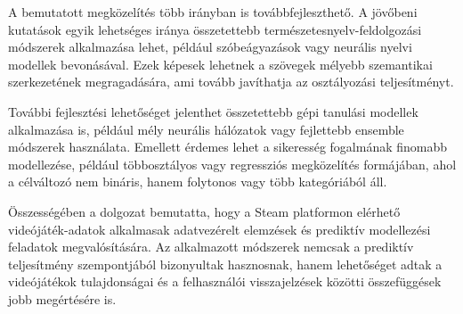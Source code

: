 A bemutatott megközelítés több irányban is továbbfejleszthető.
A jövőbeni kutatások egyik lehetséges iránya
összetettebb természetesnyelv-feldolgozási módszerek alkalmazása lehet,
például szóbeágyazások vagy neurális nyelvi modellek bevonásával.
Ezek képesek lehetnek a szövegek mélyebb szemantikai szerkezetének
megragadására, ami tovább javíthatja az osztályozási teljesítményt.

További fejlesztési lehetőséget jelenthet
összetettebb gépi tanulási modellek alkalmazása is,
például mély neurális hálózatok vagy fejlettebb ensemble módszerek használata.
Emellett érdemes lehet a sikeresség fogalmának finomabb modellezése,
például többosztályos vagy regressziós megközelítés formájában,
ahol a célváltozó nem bináris,
hanem folytonos vagy több kategóriából áll.

Összességében a dolgozat bemutatta,
hogy a Steam platformon elérhető videójáték-adatok
alkalmasak adatvezérelt elemzések és prediktív modellezési feladatok
megvalósítására.
Az alkalmazott módszerek nemcsak a prediktív teljesítmény szempontjából
bizonyultak hasznosnak,
hanem lehetőséget adtak a videójátékok tulajdonságai
és a felhasználói visszajelzések közötti összefüggések
jobb megértésére is.
